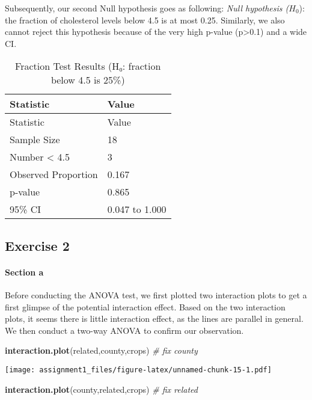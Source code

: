 \documentclass[
]{article}
\newenvironment{Shaded}{\begin{snugshade}}{\end{snugshade}}
\newcommand{\CommentTok}[1]{\textcolor[rgb]{0.56,0.35,0.01}{\textit{#1}}}
\newcommand{\FunctionTok}[1]{\textcolor[rgb]{0.13,0.29,0.53}{\textbf{#1}}}
\newcommand{\NormalTok}[1]{#1}
\begin{document}
Subsequently, our second Null hypothesis goes as following: \emph{Null
hypothesis (}\(H_0\)): the fraction of cholesterol levels below 4.5 is
at most 0.25. Similarly, we also cannot reject this hypothesis because
of the very high p-value (p\textgreater0.1) and a wide CI.

\begin{longtable}[]{@{}ll@{}}
\caption{Fraction Test Results (H₀: fraction below 4.5 is
25\%)}\tabularnewline
\toprule\noalign{}
Statistic & Value \\
\midrule\noalign{}
\endfirsthead
\toprule\noalign{}
Statistic & Value \\
\midrule\noalign{}
\endhead
\bottomrule\noalign{}
\endlastfoot
Sample Size & 18 \\
Number \textless{} 4.5 & 3 \\
Observed Proportion & 0.167 \\
p-value & 0.865 \\
95\% CI & 0.047 to 1.000 \\
\end{longtable}

\subsection{Exercise 2}\label{exercise-2}

\paragraph{Section a}\label{section-a}

Before conducting the ANOVA test, we first plotted two interaction plots
to get a first glimpse of the potential interaction effect. Based on the
two interaction plots, it seems there is little interaction effect, as
the lines are parallel in general. We then conduct a two-way ANOVA to
confirm our observation.

\begin{Shaded}
\begin{Highlighting}[]
\FunctionTok{interaction.plot}\NormalTok{(related,county,crops) }\CommentTok{\# fix county}
\end{Highlighting}
\end{Shaded}

\texttt{[image: assignment1\_files/figure-latex/unnamed-chunk-15-1.pdf]}

\begin{Shaded}
\begin{Highlighting}[]
\FunctionTok{interaction.plot}\NormalTok{(county,related,crops) }\CommentTok{\# fix related}
\end{Highlighting}
\end{Shaded}
\end{document}

